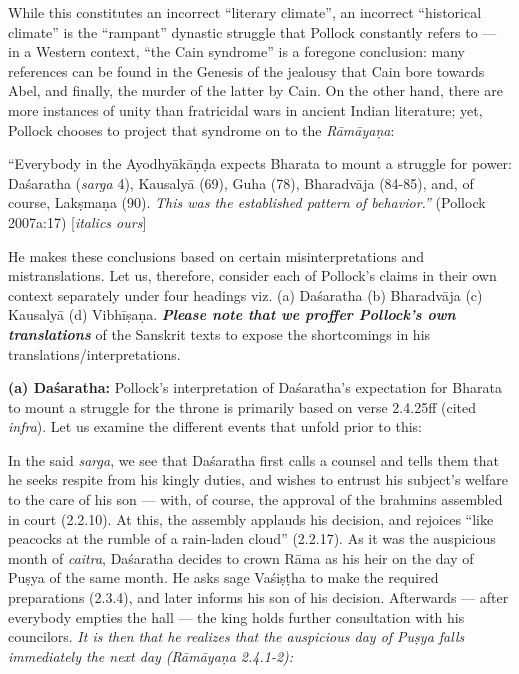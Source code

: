 While this constitutes an incorrect “literary climate”, an incorrect “historical climate” is the “rampant” dynastic struggle that Pollock constantly refers to --- in a Western context, “the Cain syndrome” is a foregone conclusion: many references can be found in the Genesis of the jealousy that Cain bore towards Abel, and finally, the murder of the latter by Cain. On the other hand, there are more instances of unity than fratricidal wars in ancient Indian literature; yet, Pollock chooses to project that syndrome on to the {\sl Rāmāyaṇa}: 

\begin{myquote}
“Everybody in the Ayodhyākāṇḍa expects Bharata to mount a struggle for power: Daśaratha ({\sl sarga} 4), Kausalyā (69), Guha (78), Bharadvāja (84-85), and, of course, Lakṣmaṇa (90). {\sl This was the established pattern of behavior.”}  
\hfill (Pollock 2007a:17) [{\sl italics ours}]
\end{myquote}

He makes these conclusions based on certain misinterpretations and mistranslations. Let us, therefore, consider each of Pollock’s claims in their own context separately under four headings viz. (a) Daśaratha (b) Bharadvāja (c) Kausalyā (d) Vibhīṣaṇa. {\sl\bfseries Please note that we proffer Pollock’s own translations} of the Sanskrit texts to expose the shortcomings in his translations/interpretations. 

\smallskip
\noindent
\textbf{(a) Daśaratha:} Pollock’s interpretation of Daśaratha’s expectation for Bharata to mount a struggle for the throne is primarily based on verse 2.4.25ff (cited {\sl infra}). Let us examine the different events that unfold prior to this: 

In the said {\sl sarga}, we see that Daśaratha first calls a counsel and tells them that he seeks respite from his kingly duties, and wishes to entrust his subject’s welfare to the care of his son --- with, of course, the approval of the brahmins assembled in court (2.2.10). At this, the assembly applauds his decision, and rejoices “like peacocks at the rumble of a rain-laden cloud” (2.2.17). As it was the auspicious month of {\sl caitra}, Daśaratha decides to crown Rāma as his heir on the day of Puṣya of the same month. He asks sage Vaśiṣṭha to make the required preparations (2.3.4), and later informs his son of his decision. Afterwards --- after everybody empties the hall --- the king holds further consultation with his councilors. {\sl It is then that he realizes that the auspicious day of Puṣya falls immediately the next day ({\sl Rāmāyaṇa} 2.4.1-2):}

